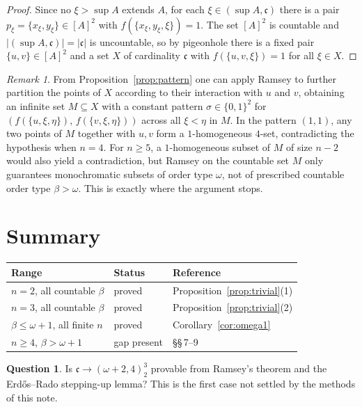 \documentclass[11pt]{article}
\theoremstyle{definition}
\newtheorem{question}[theorem]{Question}
\theoremstyle{remark}
\newtheorem{remark}[theorem]{Remark}
\newcommand{\cc}{\mathfrak{c}}
\begin{document}
\begin{proof}
Since no $\xi>\sup A$ extends $A$, for each $\xi\in(\sup A,\cc)$ there is a pair $p_\xi=\{x_\xi,y_\xi\}\in[A]^2$ with $f(\{x_\xi,y_\xi,\xi\})=1$. The set $[A]^2$ is countable and $|(\sup A,\cc)|=|\cc|$ is uncountable, so by pigeonhole there is a fixed pair $\{u,v\}\in[A]^2$ and a set $X$ of cardinality $\cc$ with $f(\{u,v,\xi\})=1$ for all $\xi\in X$.
\end{proof}

\begin{remark}
From Proposition~\ref{prop:pattern} one can apply Ramsey to further partition the points of $X$ according to their interaction with $u$ and $v$, obtaining an infinite set $M\subseteq X$ with a constant pattern $\sigma\in\{0,1\}^2$ for $(f(\{u,\xi,\eta\}),\,f(\{v,\xi,\eta\}))$ across all $\xi<\eta$ in $M$. In the pattern $(1,1)$, any two points of $M$ together with $u,v$ form a $1$-homogeneous $4$-set, contradicting the hypothesis when $n=4$. For $n\ge 5$, a $1$-homogeneous subset of $M$ of size $n-2$ would also yield a contradiction, but Ramsey on the countable set $M$ only guarantees monochromatic subsets of order type $\omega$, not of prescribed countable order type $\beta>\omega$. This is exactly where the argument stops.
\end{remark}

\section{Summary}

\begin{center}
\renewcommand{\arraystretch}{1.3}
\begin{tabular}{lll}
\textbf{Range} & \textbf{Status} & \textbf{Reference} \\
\hline
$n=2$, all countable $\beta$ & proved & Proposition~\ref{prop:trivial}(1) \\
$n=3$, all countable $\beta$ & proved & Proposition~\ref{prop:trivial}(2) \\
$\beta\le\omega+1$, all finite $n$ & proved & Corollary~\ref{cor:omega1} \\
$n\ge 4$, $\beta>\omega+1$ & gap present & \S\S\,7--9 \\
\end{tabular}
\end{center}

\begin{question}
Is $\cc\to(\omega{+}2,4)^3_2$ provable from Ramsey's theorem and the Erd\H{o}s--Rado stepping-up lemma? This is the first case not settled by the methods of this note.
\end{question}
\end{document}
